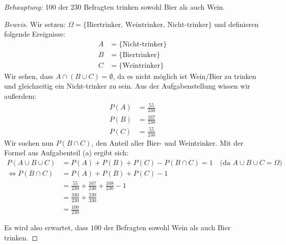 \documentclass[10pt]{article}
\begin{document}
\textit{Behauptung: } 100 der 230 Befragten trinken sowohl Bier als auch Wein.
\begin{proof}[Beweis]
Wir setzen: $\Omega = \{\text{Biertrinker, Weintrinker, Nicht-trinker}\}$ und definieren folgende Ereignisse: 
\begin{align*}
    A &= \{\text{Nicht-trinker}\} \\
    B &= \{\text{Biertrinker}\} \\
    C &= \{\text{Weintrinker}\}
\end{align*}
Wir sehen, dass $A \cap (B \cup C) = \emptyset$, da es nicht möglich ist Wein/Bier zu trinken und gleichzeitig ein Nicht-trinker zu sein.
Aus der Aufgabenstellung wissen wir außerdem:
\begin{align*}
    P(A) &= \frac{55}{230} \\
    P(B) &= \frac{167}{230} \\
    P(C) &= \frac{55}{230}
\end{align*}
Wir suchen nun $P(B\cap C)$, den Anteil aller Bier- und Weintrinker. Mit der Formel aus Aufgabenteil (a) ergibt sich:
\begin{align*}
P(A \cup B \cup C) &= P(A) + P(B) + P(C) - P(B \cap C) = 1 \quad\text{(da $A\cup B\cup C = \Omega$)} \\
\Leftrightarrow P(B \cap C) &= P(A) + P(B) + P(C) - 1 \\
&= \frac{55}{230} + \frac{167}{230} + \frac{108}{230} - 1 \\
&= \frac{330}{230} + \frac{230}{330} \\
&= \frac{100}{230}
\end{align*}

Es wird also erwartet, dass $100$ der Befragten sowohl Wein als auch Bier trinken.
\end{proof}
\end{document}
